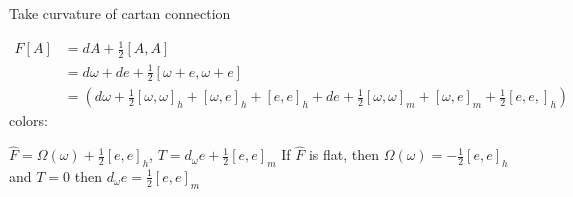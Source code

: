 Take curvature of cartan connection 

\begin{align*}
    F[A] &= dA + \frac{1}{2}[A,A] \\
    &=d \omega + de + \frac{1}{2} [\omega + e, \omega + e] \\
    &= \left(
    d \omega + \frac{1}{2}[\omega, \omega]_h + [\omega , e]_h + [e,e]_h
    +de + \frac{1}{2}[\omega,\omega]_m + [\omega,e]_m + \frac{1}{2}[e,e,]_h
    \right)
\end{align*}
colors:

$\hat{F} = \Omega(\omega) + \frac{1}{2}[e,e]_h$,
$T = d_\omega e + \frac{1}{2} [e,e]_m$
If $\hat{F}$ is flat, then $\Omega(\omega) = -\frac{1}{2}[e,e]_h$ and
$T = 0$ then $d_\omega e = \frac{1}{2}[e,e]_m$

